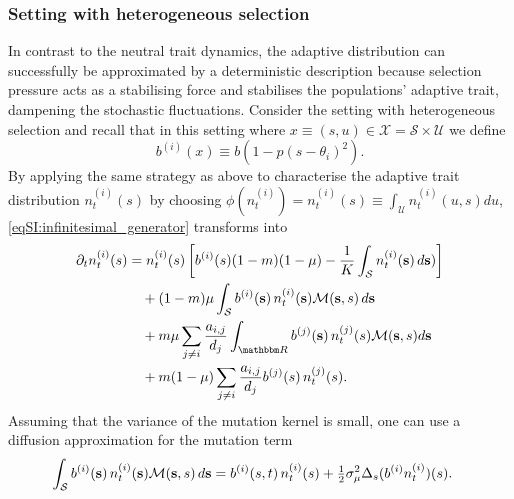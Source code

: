 \subsubsection{Setting with heterogeneous selection}\label{sec:anal_sett_2}
In contrast to the neutral trait dynamics, the adaptive distribution can successfully be approximated by a deterministic description because selection pressure acts as a stabilising force and stabilises the populations' adaptive trait, dampening the stochastic fluctuations.
%
Consider the setting with heterogeneous selection and recall that in this setting where $x \equiv (s,u) \in \mathcal{X} = \mathcal{S} \times \mathcal{U}$ we define
\begin{equation}\label{eqSI:b_d_sett2}
  b^{(i)}(x) \equiv b(1-p(s-\theta_i)^2).
\end{equation}
%
By applying the same strategy as above to characterise the adaptive trait distribution $n^{(i)}_t(s)$ by choosing $\phi(n^{(i)}_t) = n^{(i)}_t(s) \equiv \int_\mathcal{U} n^{(i)}_t(u,s) du $, \cref{eqSI:infinitesimal_generator} transforms into
%
\begin{equation}\label{eqSI:general_equation}
    \begin{split}
    \partial_t n_t^{(i)}(s) &= n_t^{(i)}(s)\left[b^{(i)}(s)(1-m)(1-\mu) - \frac{1}{K}\int_\mathcal{S} n_t^{(i)}({\textbf s}) \, d {\textbf s})\right] \\
    &\quad + (1- m)\mu \int_\mathcal{S} b^{(i)}({\textbf s}) \, n_t^{(i)}( {\textbf s})  \mathcal{M}({\textbf s}, s) \, d{\textbf s} \\
    &\quad + m \mu \sum_{j\neq i}\frac{a_{i,j}}{d_j}  \int_\R b^{(j)}({\textbf s}) \,  n_t^{(j)}(s) \mathcal{M}({\textbf s}, s) d{\textbf s}\\
    &\quad + m (1 - \mu) \sum_{j\neq i}\frac{a_{i,j}}{d_j}  b^{(j)}(s) \, n_t^{(j)}(s).
  \end{split}
\end{equation}
%
Assuming that the variance of the mutation kernel is small, one can use a diffusion approximation for the mutation term \citep{Kimura1965,Debarre2013,Mirrahimi2020}
\begin{equation}
  \begin{split}
  \int_\mathcal{S} b^{(i)}({\textbf s}) \, n_t^{(i)}({\textbf s}) \mathcal{M}({\textbf s}, s) \, d{\textbf s} 
          &= b^{(i)}(s,t) \, n_t^{(i)}(s) + \tfrac{1}{2} \sigma_\mu^2 \Delta_s ( b^{(i)} n_t^{(i)})(s) .
  \end{split}
\end{equation}
%
